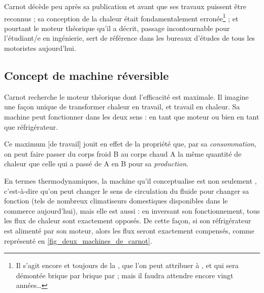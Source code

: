 		 Carnot décède peu après sa publication et avant que ses travaux puissent être reconnus ; sa conception de la chaleur était fondamentalement erronée\footnote{Il s’agit encore et toujours de la , que l’on peut attribuer à , et qui sera démontée brique par brique par  ; mais il faudra attendre encore vingt années…}%
		 ; et pourtant le moteur théorique qu’il a décrit, passage incontournable pour l’étudiant/e en ingénierie, sert de référence dans les bureaux d’études de tous les motoristes aujourd’hui.


	\subsection{Concept de machine réversible}
	\label{ch_concept_machine_reversible}

		Carnot recherche le moteur théorique dont l’efficacité est maximale. Il imagine une façon unique de transformer chaleur en travail, et travail en chaleur. Sa machine peut fonctionner dans les deux sens : en tant que moteur ou bien en tant que réfrigérateur.

			Ce maximum [de travail] jouit en effet de la propriété que, par sa \emph{consommation}, on peut faire passer du corps froid B au corps chaud A la même quantité de chaleur que celle qui a passé de A en B pour sa \emph{production}.
		
		En termes thermodynamiques, la machine qu’il conceptualise est non seulement , c’est-à-dire qu’on peut changer le sens de circulation du fluide pour changer sa fonction (tels de nombreux climatiseurs domestiques disponibles dans le commerce aujourd’hui), mais elle est aussi  : en inversant son fonctionnement, tous les flux de chaleur sont exactement opposés. De cette façon, si son réfrigérateur est alimenté par son moteur, alors les flux seront exactement compensés, comme représenté en \cref{fig_deux_machines_de_carnot}.

